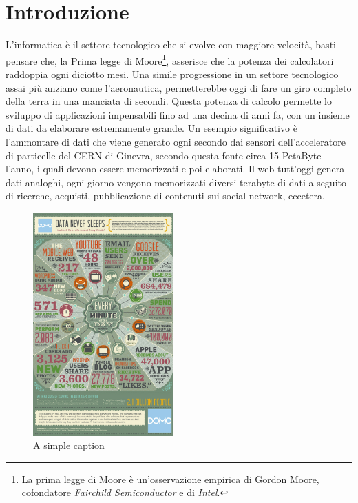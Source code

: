
\chapter{Introduzione}
L'informatica è il settore tecnologico che si evolve con maggiore velocità, basti pensare che, la Prima legge di Moore\footnote{La prima legge di Moore è un'osservazione empirica di Gordon Moore, cofondatore \emph{Fairchild Semiconductor} e di \emph{Intel}.}, asserisce che la potenza dei calcolatori raddoppia ogni diciotto mesi. Una simile progressione in un settore tecnologico assai più anziano come l'aeronautica, permetterebbe oggi di fare un giro completo della terra in una manciata di secondi. Questa potenza di calcolo permette lo sviluppo di applicazioni impensabili fino ad una decina di anni fa, con un insieme di dati da elaborare estremamente grande. Un esempio significativo è l'ammontare di dati che viene generato ogni secondo dai sensori dell'acceleratore di particelle del CERN di Ginevra, secondo questa fonte \cite{presentation_cern} circa 15 PetaByte l'anno, i quali devono essere memorizzati e poi elaborati. Il web tutt'oggi genera dati analoghi, ogni giorno vengono memorizzati diversi terabyte di dati a seguito di ricerche, acquisti, pubblicazione di contenuti sui social network, eccetera. 
\begin{figure}[r]
	\centering
	\includegraphics[width=0.48\textwidth]{Data-in-One-Minute.jpg}
	\caption{A simple caption}
	\label{data_per_minute}
\end{figure}
